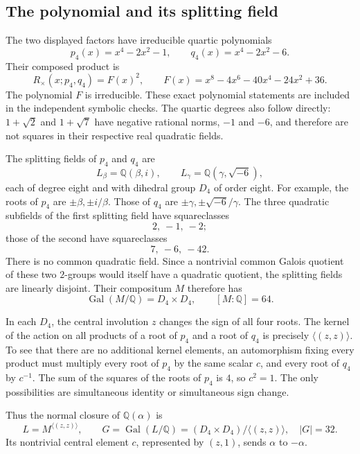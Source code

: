 \documentclass[11pt,letterpaper]{article}
\theoremstyle{definition}\newtheorem{definition}[theorem]{Definition}
\theoremstyle{remark}\newtheorem{remark}[theorem]{Remark}
\newcommand{\Q}{\mathbb Q}
\newcommand{\Gal}{\operatorname{Gal}}
\begin{document}
\subsection{The polynomial and its splitting field}
The two displayed factors have irreducible quartic polynomials
\[
 p_4(x)=x^4-2x^2-1,\qquad q_4(x)=x^4-2x^2-6.
\]
Their composed product is
\begin{equation}
 R_\times(x;p_4,q_4)=F(x)^2,
 \qquad F(x)=x^8-4x^6-40x^4-24x^2+36.
 \label{eq:counterpoly}
\end{equation}
The polynomial $F$ is irreducible. These exact polynomial statements are included in the independent symbolic checks. The quartic degrees also follow directly: $1+\sqrt2$ and $1+\sqrt7$ have negative rational norms, $-1$ and $-6$, and therefore are not squares in their respective real quadratic fields.

The splitting fields of $p_4$ and $q_4$ are
\[
 L_\beta=\Q(\beta,i),\qquad L_\gamma=\Q(\gamma,\sqrt{-6}),
\]
each of degree eight and with dihedral group $D_4$ of order eight. For example, the roots of $p_4$ are $\pm\beta,\pm i/\beta$. Those of $q_4$ are $\pm\gamma,\pm\sqrt{-6}/\gamma$. The three quadratic subfields of the first splitting field have squareclasses
\[
 2,\ -1,\ -2;
\]
those of the second have squareclasses
\[
 7,\ -6,\ -42.
\]
There is no common quadratic field. Since a nontrivial common Galois quotient of these two $2$-groups would itself have a quadratic quotient, the splitting fields are linearly disjoint. Their compositum $M$ therefore has
\[
 \Gal(M/\Q)=D_4\times D_4,\qquad [M:\Q]=64.
\]

In each $D_4$, the central involution $z$ changes the sign of all four roots. The kernel of the action on all products of a root of $p_4$ and a root of $q_4$ is precisely $\langle(z,z)\rangle$. To see that there are no additional kernel elements, an automorphism fixing every product must multiply every root of $p_4$ by the same scalar $c$, and every root of $q_4$ by $c^{-1}$. The sum of the squares of the roots of $p_4$ is $4$, so $c^2=1$. The only possibilities are simultaneous identity or simultaneous sign change.

Thus the normal closure of $\Q(\alpha)$ is
\begin{equation}
 L=M^{\langle(z,z)\rangle},\qquad
 G=\Gal(L/\Q)=(D_4\times D_4)/\langle(z,z)\rangle,
 \quad |G|=32.
 \label{eq:extraspecial}
\end{equation}
Its nontrivial central element $c$, represented by $(z,1)$, sends $\alpha$ to $-\alpha$.
\end{document}

